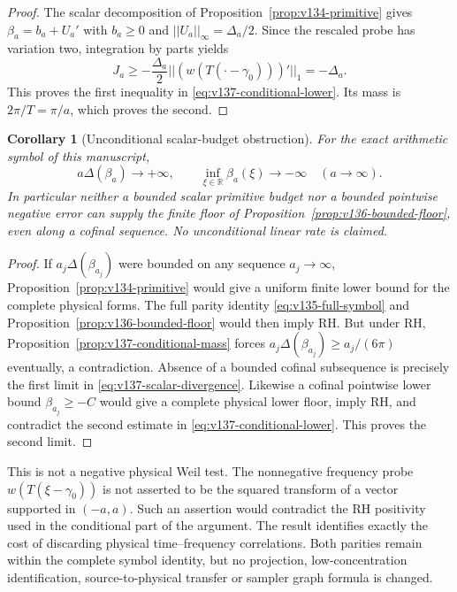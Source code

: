 \documentclass[11pt]{article}
\def\norm#1{||#1||}%
\newtheorem{corollary}[theorem]{Corollary}
\theoremstyle{remark}
\newcommand{\norm}[1]{\left\lVert #1\right\rVert}
\begin{document}
\begin{proof}
The scalar decomposition of Proposition~\ref{prop:v134-primitive}
gives $\beta_a=b_a+U_a'$ with $b_a\ge0$ and
$\norm{U_a}_\infty=\Delta_a/2$. Since the rescaled probe has variation
two, integration by parts yields
\[
 J_a\ge-\frac{\Delta_a}{2}
      \norm{(w(T(\cdot-\gamma_0)))'}_1=-\Delta_a.
\]
This proves the first inequality in \eqref{eq:v137-conditional-lower}.
Its mass is $2\pi/T=\pi/a$, which proves the second.
\end{proof}

\begin{corollary}[Unconditional scalar-budget obstruction]
\label{cor:v137-scalar-no-go}
For the exact arithmetic symbol of this manuscript,
\begin{equation}\label{eq:v137-scalar-divergence}
 a\Delta(\beta_a)\longrightarrow+\infty,
 \qquad
 \inf_{\xi\in\mathbb R}\beta_a(\xi)\longrightarrow-\infty
 \quad(a\longrightarrow\infty).
\end{equation}
In particular neither a bounded scalar primitive budget nor a bounded
pointwise negative error can supply the finite floor of
Proposition~\ref{prop:v136-bounded-floor}, even along a cofinal sequence.
No unconditional linear rate is claimed.
\end{corollary}
\begin{proof}
If $a_j\Delta(\beta_{a_j})$ were bounded on any sequence
$a_j\to\infty$, Proposition~\ref{prop:v134-primitive} would give a
uniform finite lower bound for the complete physical forms. The full
parity identity \eqref{eq:v135-full-symbol} and
Proposition~\ref{prop:v136-bounded-floor} would then imply RH.
But under RH, Proposition~\ref{prop:v137-conditional-mass} forces
$a_j\Delta(\beta_{a_j})\ge a_j/(6\pi)$ eventually, a contradiction.
Absence of a bounded cofinal subsequence is precisely the first limit
in \eqref{eq:v137-scalar-divergence}.
Likewise a cofinal pointwise lower bound $\beta_{a_j}\ge-C$ would
give a complete physical lower floor, imply RH, and contradict the
second estimate in \eqref{eq:v137-conditional-lower}.
This proves the second limit.
\end{proof}

This is not a negative physical Weil test. The nonnegative frequency
probe $w(T(\xi-\gamma_0))$ is not asserted to be the squared transform
of a vector supported in $(-a,a)$. Such an assertion would contradict
the RH positivity used in the conditional part of the argument.
The result identifies exactly the cost of discarding physical
time--frequency correlations. Both parities remain within the complete
symbol identity, but no projection, low-concentration identification,
source-to-physical transfer or sampler graph formula is changed.
\end{document}
